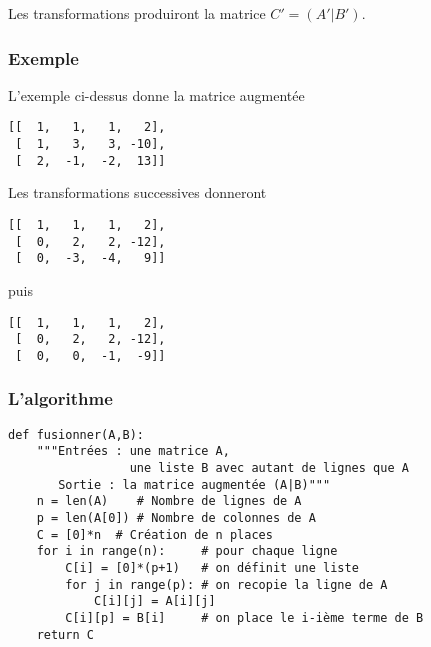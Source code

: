 Les transformations produiront la matrice $C' = (A'|B')$.
\subsubsection{Exemple}
L'exemple ci-dessus donne la matrice augmentée
\begin{lstlisting}
[[  1,   1,   1,   2],
 [  1,   3,   3, -10],
 [  2,  -1,  -2,  13]]
\end{lstlisting}
Les transformations successives donneront
\begin{lstlisting}
[[  1,   1,   1,   2],
 [  0,   2,   2, -12],
 [  0,  -3,  -4,   9]]
\end{lstlisting}
puis
\begin{lstlisting}
[[  1,   1,   1,   2],
 [  0,   2,   2, -12],
 [  0,   0,  -1,  -9]]
\end{lstlisting}
\subsubsection{L'algorithme}
\begin{lstlisting}
def fusionner(A,B):
    """Entrées : une matrice A, 
                 une liste B avec autant de lignes que A
       Sortie : la matrice augmentée (A|B)"""
    n = len(A)    # Nombre de lignes de A
    p = len(A[0]) # Nombre de colonnes de A
    C = [0]*n  # Création de n places
    for i in range(n):     # pour chaque ligne
        C[i] = [0]*(p+1)   # on définit une liste
        for j in range(p): # on recopie la ligne de A
            C[i][j] = A[i][j]
        C[i][p] = B[i]     # on place le i-ième terme de B
    return C
\end{lstlisting}
\newpage
